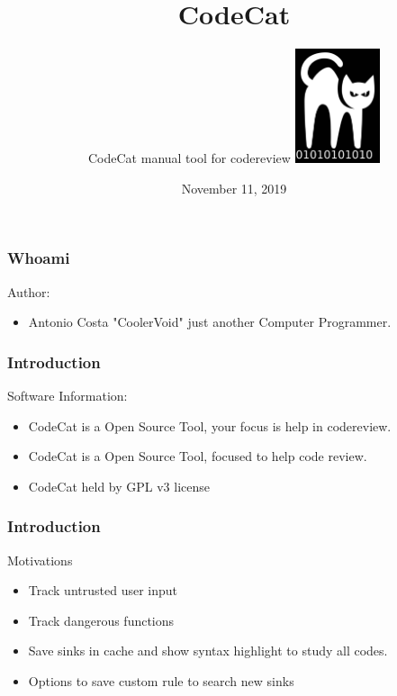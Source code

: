 \documentclass[serif,mathserif]{beamer}
\author[CodeCat v0.4]{ CodeCat manual tool for codereview \quad \includegraphics[width=2.5cm]{images/codecat01.png} }
\title[ Page \hspace{2em}\insertframenumber/\inserttotalframenumber]{CodeCat}
\date{November 11, 2019}
\institute{Antonio Costa - CoolerVoid - coolerlair[aT]gmail[DOt]com}
\begin{document}
\maketitle



\begin{frame}
  \frametitle{Whoami}
  Author:
  \begin{itemize}  \item Antonio Costa "CoolerVoid" just another Computer Programmer.
  \end{itemize}
  \begin{figure}[t]
    \centering
  \end{figure}
\end{frame}


\begin{frame}
  \frametitle{Introduction}
  Software Information:
  \begin{itemize}
  \item  CodeCat is a Open Source Tool, your focus is help in codereview. 
  \item  CodeCat is a Open Source Tool, focused to help code review. 
  \item  CodeCat held by GPL v3 license
  \end{itemize}
\end{frame}



\begin{frame}
  \frametitle{Introduction}
  Motivations
  \begin{itemize}
  \item  Track untrusted user input 
  \item  Track dangerous functions
  \item  Save sinks in cache and show syntax highlight to study all codes.
  \item  Options to save custom rule to search new sinks	  
  \end{itemize}
\end{frame}
\end{document}
